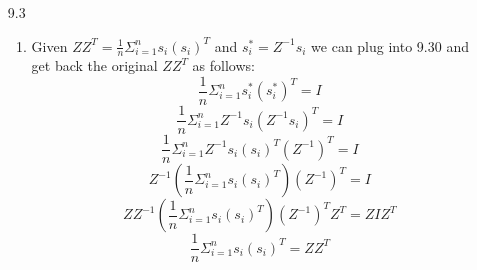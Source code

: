 \documentclass[11pt,a4paper]{article}
\begin{document}
\begin{itemize}
\begin{enumerate} [label={\alph*)}]
				\end{enumerate}
					
			\item[9.3]
				\begin{enumerate} [label={\alph*)}]
					\item Given $ZZ^T = \frac{1}{n} \Sigma_{i=1}^{n} s_i(s_i)^T$ and $s_i^* = Z^{-1}s_i$ we can plug into 9.30 and get back the original $ZZ^T$ as follows:
					\begin{equation}
						\frac{1}{n} \Sigma_{i=1}^{n} s_i^*(s_i^*)^T = I
					\end{equation}
					\begin{equation}
						\frac{1}{n} \Sigma_{i=1}^{n} Z^{-1}s_i(Z^{-1}s_i)^T = I
					\end{equation}
					\begin{equation}
						\frac{1}{n} \Sigma_{i=1}^{n} Z^{-1}s_i (s_i)^T (Z^{-1})^{T}= I
					\end{equation}
					\begin{equation}
						Z^{-1} (\frac{1}{n} \Sigma_{i=1}^{n} s_i (s_i)^T) (Z^{-1})^{T}= I
					\end{equation}
					\begin{equation}
						ZZ^{-1} (\frac{1}{n} \Sigma_{i=1}^{n} s_i (s_i)^T) (Z^{-1})^{T}Z^T= ZIZ^T
					\end{equation}
					\begin{equation}
						\frac{1}{n} \Sigma_{i=1}^{n} s_i(s_i)^T = ZZ^T
					\end{equation}
					

\end{enumerate}
\end{itemize}
\end{document}
